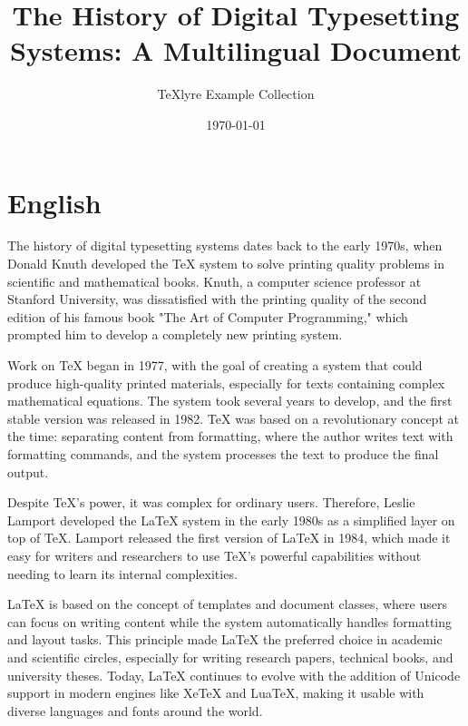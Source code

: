 \documentclass[a4paper,12pt]{article}
\title{The History of Digital Typesetting Systems: A Multilingual Document}
\author{TeXlyre Example Collection}
\date{\today}
\begin{document}
\maketitle

\section{English}
  The history of digital typesetting systems dates back to the early 1970s, when Donald Knuth developed the TeX system to solve printing quality problems in scientific and mathematical books. Knuth, a computer science professor at Stanford University, was dissatisfied with the printing quality of the second edition of his famous book "The Art of Computer Programming," which prompted him to develop a completely new printing system.
  
  Work on TeX began in 1977, with the goal of creating a system that could produce high-quality printed materials, especially for texts containing complex mathematical equations. The system took several years to develop, and the first stable version was released in 1982. TeX was based on a revolutionary concept at the time: separating content from formatting, where the author writes text with formatting commands, and the system processes the text to produce the final output.
  
  Despite TeX's power, it was complex for ordinary users. Therefore, Leslie Lamport developed the LaTeX system in the early 1980s as a simplified layer on top of TeX. Lamport released the first version of LaTeX in 1984, which made it easy for writers and researchers to use TeX's powerful capabilities without needing to learn its internal complexities.
  
  LaTeX is based on the concept of templates and document classes, where users can focus on writing content while the system automatically handles formatting and layout tasks. This principle made LaTeX the preferred choice in academic and scientific circles, especially for writing research papers, technical books, and university theses. Today, LaTeX continues to evolve with the addition of Unicode support in modern engines like XeTeX and LuaTeX, making it usable with diverse languages and fonts around the world.
\end{document}
